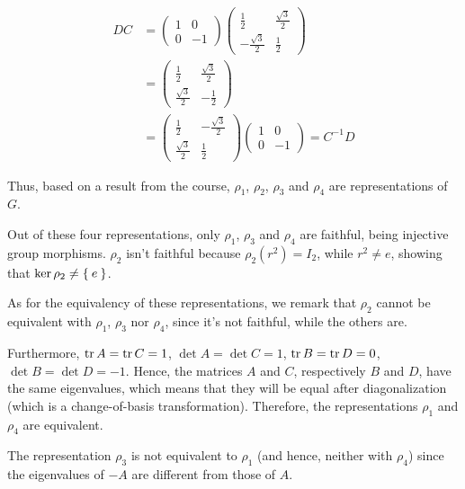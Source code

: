\begin{solution}
\begin{align*}
    DC &= \begin{pmatrix}
        1 & 0 \\
        0 & -1
    \end{pmatrix}
    \begin{pmatrix}
        \frac{1}{2} & \frac{\sqrt{3}}{2} \\
        -\frac{\sqrt{3}}{2} & \frac{1}{2}
    \end{pmatrix} \\
    &= \begin{pmatrix}
        \frac{1}{2} & \frac{\sqrt{3}}{2} \\
        \frac{\sqrt{3}}{2} & -\frac{1}{2}
    \end{pmatrix} \\
    &= \begin{pmatrix}
        \frac{1}{2} & -\frac{\sqrt{3}}{2} \\
        \frac{\sqrt{3}}{2} & \frac{1}{2}
    \end{pmatrix}
    \begin{pmatrix}
        1 & 0 \\
        0 & -1
    \end{pmatrix} = C^{-1} D
\end{align*}

Thus, based on a result from the course, \(\rho_1\), \(\rho_2\), \(\rho_3\) and \(\rho_4\) are representations of \(G\).

Out of these four representations, only \(\rho_1\), \(\rho_3\) and \(\rho_4\) are faithful, being injective group morphisms. \(\rho_2\) isn't faithful because \(\rho_2 (r^2) = I_2\), while \(r^2 \neq e\), showing that \(\ker \rho_2 \neq \Set{ e }\).

As for the equivalency of these representations, we remark that \(\rho_2\) cannot be equivalent with \(\rho_1\), \(\rho_3\) nor \(\rho_4\), since it's not faithful, while the others are.

Furthermore, \(\operatorname*{tr} A = \operatorname*{tr} C = 1\), \(\det A = \det C = 1\), \(\operatorname*{tr} B = \operatorname*{tr} D = 0\), \(\det B = \det D = -1\). Hence, the matrices \(A\) and \(C\), respectively \(B\) and \(D\), have the same eigenvalues, which means that they will be equal after diagonalization (which is a change-of-basis transformation). Therefore, the representations \(\rho_1\) and \(\rho_4\) are equivalent.

The representation \(\rho_3\) is not equivalent to \(\rho_1\) (and hence, neither with \(\rho_4\)) since the eigenvalues of \(-A\) are different from those of \(A\).
\end{solution}

